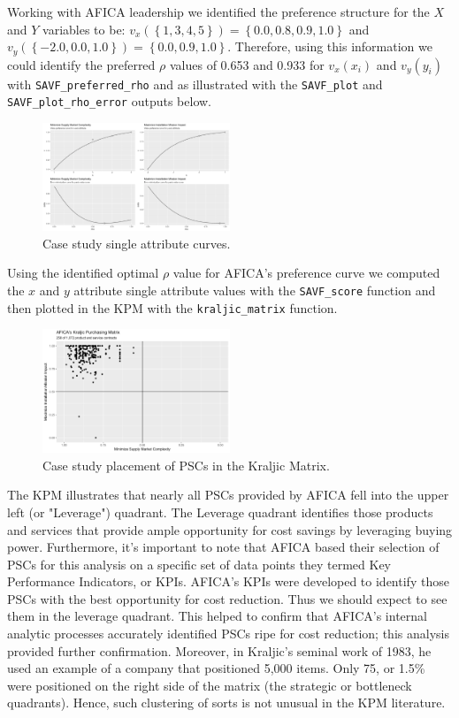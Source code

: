 \documentclass[twocolumn]{svjour3}       %
\begin{document}
Working with AFICA leadership we identified the preference structure for the $X$ and $Y$ variables to be: $v_x\left(\left\{1, 3, 4, 5\right\}\right) = \left\{0.0, 0.8, 0.9, 1.0\right\}$ and $v_y\left(\left\{-2.0, 0.0, 1.0\right\}\right) = \left\{0.0, 0.9, 1.0\right\}$. Therefore, using this information we could identify the preferred $\rho$ values of 0.653 and 0.933 for $v_x\left(x_i\right)$ and $v_y\left(y_i\right)$ with \texttt{SAVF\_preferred\_rho} and as illustrated with the \texttt{SAVF\_plot} and \texttt{\texttt{SAVF\_plot}\_rho\_error} outputs below.

\begin{figure}[!htb]
  \includegraphics[width=0.5\textwidth]{fig6.png}
  \caption{Case study single attribute curves.}
  \label{fig:6}
\end{figure}

Using the identified optimal $\rho$ value for AFICA's preference curve we computed the $x$ and $y$ attribute single attribute values with the \texttt{SAVF\_score} function and then plotted in the KPM with the \texttt{kraljic\_matrix} function.

\begin{figure}[!htb]
  \includegraphics[width=0.5\textwidth]{fig7.png}
  \caption{Case study placement of PSCs in the Kraljic Matrix.}
  \label{fig:7}
\end{figure}

The KPM illustrates that nearly all PSCs provided by AFICA fell into the upper left (or "Leverage") quadrant.  The Leverage quadrant identifies those products and services that provide ample opportunity for cost savings by leveraging buying power.  Furthermore, it's important to note that AFICA based their selection of PSCs for this analysis on a specific set of data points they termed Key Performance Indicators, or KPIs. AFICA's KPIs were developed to identify those PSCs with the best opportunity for cost reduction. Thus we should expect to see them in the leverage quadrant. This helped to confirm that AFICA's internal analytic processes accurately identified PSCs ripe for cost reduction; this analysis provided further confirmation. Moreover, in Kraljic's seminal work of 1983, he used an example of a company that positioned 5,000 items. Only 75, or 1.5\% were positioned on the right side of the matrix (the strategic or bottleneck quadrants). Hence, such clustering of sorts is not unusual in the KPM literature. 
\end{document}
